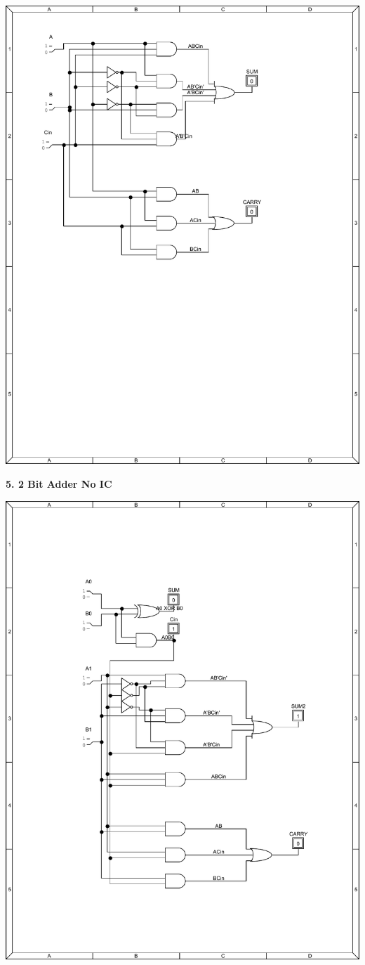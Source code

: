 \documentclass[12pt]{article}
\begin{document}
        \includegraphics[scale=.5]{fulladderpdf}

    \bf{5.} 2 Bit Adder No IC 

        \includegraphics[scale=.5]{2bitadderpdfnoic}
\end{document}
